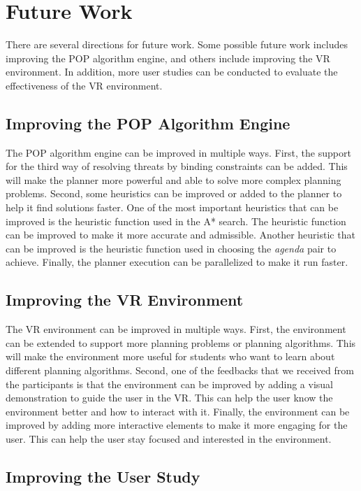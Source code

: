 \section{Future Work}

There are several directions for future work. Some possible future work includes improving the \ac{POP} algorithm engine, and others include improving the \ac{VR} environment. In addition, more user studies can be conducted to evaluate the effectiveness of the \ac{VR} environment.

\subsection{Improving the POP Algorithm Engine}

The \ac{POP} algorithm engine can be improved in multiple ways. First, the support for the third way of resolving threats by binding constraints can be added. This will make the planner more powerful and able to solve more complex planning problems. Second, some heuristics can be improved or added to the planner to help it find solutions faster. One of the most important heuristics that can be improved is the heuristic function used in the \ac{A*} search. The heuristic function can be improved to make it more accurate and admissible. Another heuristic that can be improved is the heuristic function used in choosing the \textit{agenda} pair to achieve. Finally, the planner execution can be parallelized to make it run faster.

\subsection{Improving the VR Environment}

The \ac{VR} environment can be improved in multiple ways. First, the environment can be extended to support more planning problems or planning algorithms. This will make the environment more useful for students who want to learn about different planning algorithms. Second, one of the feedbacks that we received from the participants is that the environment can be improved by adding a visual demonstration to guide the user in the \ac{VR}. This can help the user know the environment better and how to interact with it. Finally, the environment can be improved by adding more interactive elements to make it more engaging for the user. This can help the user stay focused and interested in the environment.

\subsection{Improving the User Study}

